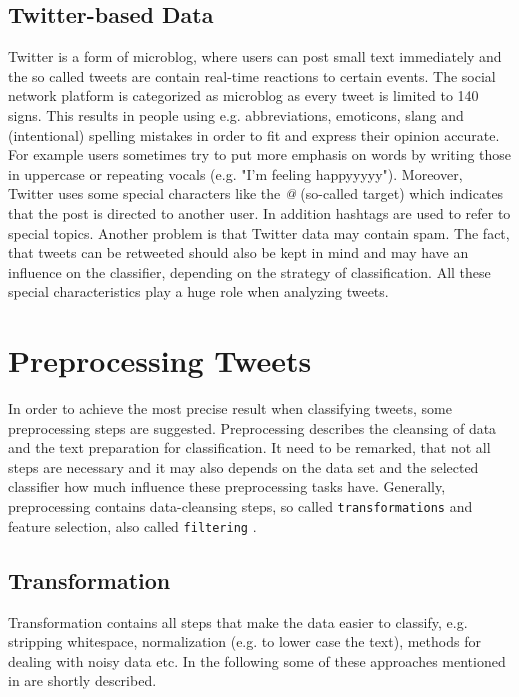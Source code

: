\documentclass{acm_proc_article-sp}
\begin{document}
\subsection{Twitter-based Data} \label{twitter-based} 
Twitter is a form of microblog, where users can
post small text immediately and the so called tweets are contain real-time
reactions to certain events. The social network platform is categorized as
microblog as every tweet is limited to 140 signs. This results in people using
e.g. abbreviations, emoticons, slang and (intentional) spelling mistakes in order to fit
and express their opinion accurate. For example users sometimes try to put more emphasis on words by writing those in uppercase or repeating vocals (e.g. "I'm feeling happyyyyy"). Moreover, Twitter uses some special
characters like the \emph{@} (so-called target) which indicates that the post is directed to another
user. In addition hashtags are used to refer to special topics.  Another problem
is that Twitter data may contain spam. The fact, that tweets can be retweeted should also be kept in mind and may have an influence on the classifier, depending on the strategy of classification.
All these special characteristics play a
huge role when analyzing tweets. \cite{agarwal2011sentiment, read2005using}


\section{Preprocessing Tweets} \label{preprocessing} In order to achieve the
most precise result when classifying tweets, some preprocessing steps are
suggested. Preprocessing describes the cleansing of data and the text preparation for classification. It need to be remarked, that not all steps are necessary and it may also depends on the data set and the selected classifier how much influence these preprocessing tasks have. 
Generally, preprocessing contains data-cleansing steps, so called \texttt{transformations} and feature selection, also called \texttt{filtering} \cite{haddi2013therole}.


\subsection{Transformation}
Transformation contains all steps that make the data easier to classify, e.g. stripping whitespace, normalization (e.g. to lower case the text), methods for dealing with noisy data etc. 
In the following some of these approaches mentioned in \cite{ting2011naive, pak2010twitter, go2009twitter, agarwal2011sentiment, pang2008opinion, haddi2013therole} are shortly described.
\end{document}
